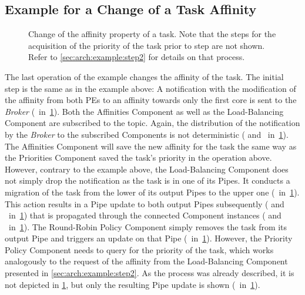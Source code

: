 \subsection{Example for a Change of a Task Affinity}%
\label{sec:arch:example:step4}

\begin{figure}[b!] \centering
	\caption[Change of the affinity property of a task.]{Change of the affinity property of a task. Note that the steps for the acquisition of the priority of the task prior to step  are not shown. Refer to \cref{sec:arch:example:step2} for details on that process.}%
	\label{fig:arch:example:step4}
\end{figure}

The last operation of the example changes the affinity of the  task. The initial step is the same as in the example above: A notification with the modification of the affinity from both \acp{PE} to an affinity towards only the first core is sent to the \emph{\cobas{} Broker} (~in~\cref{fig:arch:example:step4}). Both the Affinities Component as well as the Load-Balancing Component are subscribed to the  topic. Again, the distribution of the notification by the \emph{Broker} to the subscribed Components is not deterministic ( and ~in~\cref{fig:arch:example:step4}). The Affinities Component will save the new affinity for the  task the same way as the Priorities Component saved the  task's priority in the operation above. However, contrary to the example above, the Load-Balancing Component does not simply drop the notification as the  task is in one of its Pipes. It conducts a migration of the task from the lower of its output Pipes to the upper one (~in~\cref{fig:arch:example:step4}). This action results in a Pipe update to both output Pipes subsequently ( and ~in~\cref{fig:arch:example:step4}) that is propagated through the connected Component instances ( and ~in~\cref{fig:arch:example:step4}). The Round-Robin Policy Component simply removes the task from its output Pipe and triggers an update on that Pipe (~in~\cref{fig:arch:example:step4}). However, the Priority Policy Component needs to query for the priority of the  task, which works analogously to the request of the affinity from the Load-Balancing Component presented in \cref{sec:arch:example:step2}. As the process was already described, it is not depicted in \cref{fig:arch:example:step4}, but only the resulting Pipe update is shown (~in~\cref{fig:arch:example:step4}).

